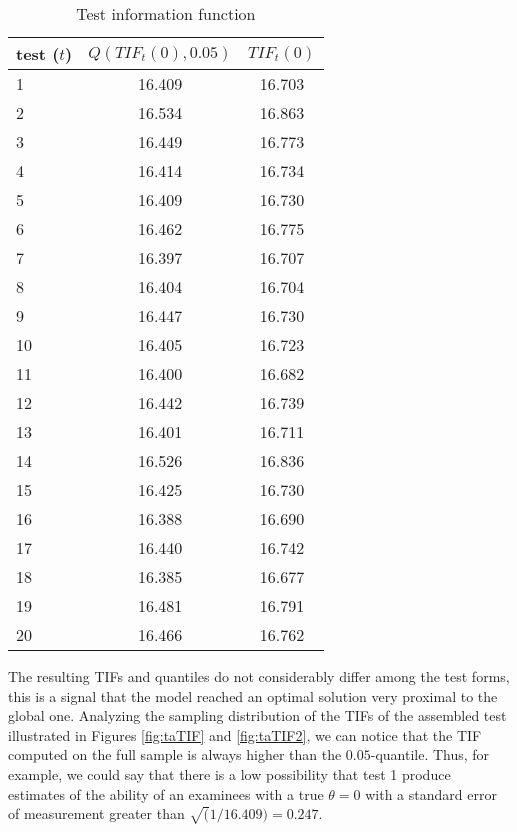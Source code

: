 \begin{table}[H] 
	\label{tab:at_TIF}
	\centering
	\def\arraystretch{0.8}
	\caption{Test information function}
	\begin{tabular}{lcc}
		\toprule
		test ($t$) & $Q(TIF_t(0),0.05)$ & $TIF_t(0)$ \\
		\midrule
		1&16.409& 16.703\\
		2&16.534& 16.863\\
		3&16.449& 16.773\\
		4&16.414& 16.734\\
		5&16.409& 16.730\\
		6&16.462& 16.775\\
		7&16.397& 16.707\\
		8&16.404& 16.704\\
		9&16.447& 16.730\\
		10&16.405& 16.723\\
		11&16.400& 16.682\\
		12&16.442& 16.739\\
		13&16.401& 16.711\\
		14&16.526& 16.836\\
		15&16.425& 16.730\\
		16&16.388& 16.690\\
		17&16.440& 16.742\\
		18&16.385& 16.677\\
		19&16.481& 16.791\\
		20&16.466& 16.762\\
		\bottomrule
	\end{tabular}
\end{table}

The resulting TIFs and quantiles do not considerably differ among the test forms, this is a signal that the model reached an optimal solution very proximal to the global one.
Analyzing the sampling distribution of the TIFs of the assembled test illustrated in Figures \ref{fig:taTIF} and \ref{fig:taTIF2}, we can notice that the TIF computed on the full sample is always higher than the $0.05$-quantile.
Thus, for example, we could say that there is a low possibility that test 1 produce estimates of the ability of an examinees with a true $\theta=0$ with a standard error of measurement greater than $\sqrt(1/16.409)=0.247$.
